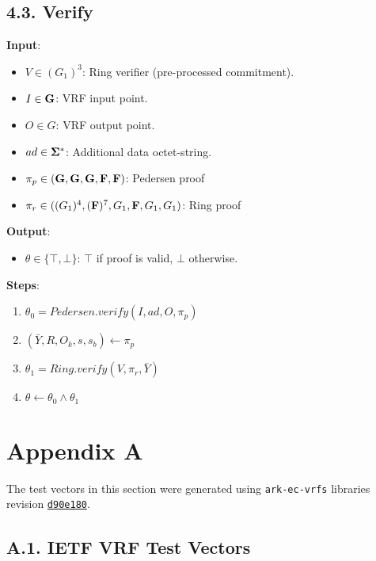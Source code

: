 \documentclass[
]{article}
\providecommand{\tightlist}{%
  \setlength{\itemsep}{0pt}\setlength{\parskip}{0pt}}
\begin{document}
\subsection{4.3. Verify}\label{verify-2}

\textbf{Input}:

\begin{itemize}
\tightlist
\item
  \(V \in (G_1)^3\): Ring verifier (pre-processed commitment).
\item
  \(I \in \bold{G}\): VRF input point.
\item
  \(O \in G\): VRF output point.
\item
  \(ad \in \bold{\Sigma}^*\): Additional data octet-string.
\item
  \(\pi_p \in (\bold{G}, \bold{G}, \bold{G}, \bold{F}, \bold{F})\):
  Pedersen proof
\item
  \(\pi_r \in ((G_1)^4, (\bold{F})^7, G_1, \bold{F}, G_1, G_1)\): Ring
  proof
\end{itemize}

\textbf{Output}:

\begin{itemize}
\tightlist
\item
  \(\theta \in \{ \top, \bot \}\): \(\top\) if proof is valid, \(\bot\)
  otherwise.
\end{itemize}

\textbf{Steps}:

\begin{enumerate}
\def\labelenumi{\arabic{enumi}.}
\tightlist
\item
  \(\theta_0 = Pedersen.verify(I, ad, O, \pi_p)\)
\item
  \((\bar{Y}, R, O_k, s, s_b) \gets \pi_p\)
\item
  \(\theta_1 = Ring.verify(V, \pi_r, \bar{Y})\)
\item
  \(\theta \gets \theta_0 \land \theta_1\)
\end{enumerate}

\section{Appendix A}\label{appendix-a}

The test vectors in this section were generated using
\texttt{ark-ec-vrfs} libraries revision
\href{https://github.com/davxy/ark-ec-vrfs/tree/d90e1800d571f32163e6f7b5d956d065668c899f}{\texttt{d90e180}}.

\subsection{A.1. IETF VRF Test
Vectors}\label{a.1.-ietf-vrf-test-vectors}
\end{document}
